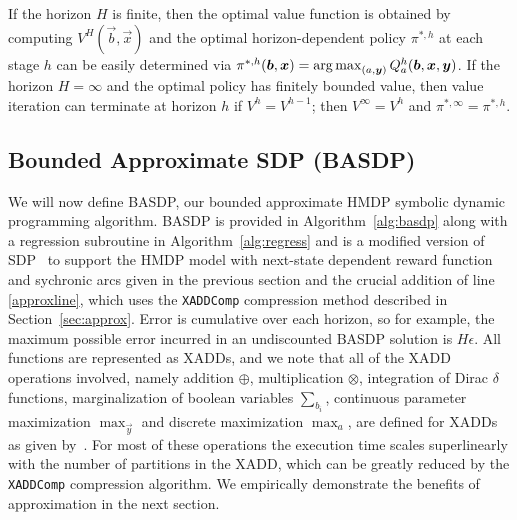 If the horizon $H$ is finite, then the optimal value function is
obtained by computing $V^H(\vec{b},\vec{x})$ and the optimal
horizon-dependent policy $\pi^{*,h}$ at each stage $h$ can be easily
determined via $\pi^{*,h}(\vec{b},\vec{x}) = \argmax_{(a, \vec{y} )}
Q^h_a(\vec{b},\vec{x},\vec{y})$.  If the horizon $H = \infty$ and the
optimal policy has finitely bounded value, then value iteration can
terminate at horizon $h$ if $V^{h} = V^{h-1}$; then $V^\infty = V^h$
and $\pi^{*,\infty} = \pi^{*,h}$.

\subsection{Bounded Approximate SDP (BASDP)}

We will now define BASDP, our bounded approximate HMDP symbolic
dynamic programming algorithm.  BASDP is provided in
Algorithm~\ref{alg:basdp} along with a regression subroutine in
Algorithm~\ref{alg:regress} and is a modified version of
SDP~\cite{zamani12} to support the HMDP model with next-state
dependent reward function and sychronic arcs given in the previous
section and the crucial addition of line \ref{approxline}, which uses
the \texttt{XADDComp} compression method described in
Section~\ref{sec:approx}.  Error is cumulative over each horizon, so for example,
the maximum possible error incurred in an undiscounted BASDP solution
is $H\epsilon$.
All functions are represented as XADDs, and we note that all of the
XADD operations involved, namely addition $\oplus$, multiplication
$\otimes$, integration of Dirac $\delta$ functions, marginalization of
boolean variables $\sum_{b_i}$, continuous parameter maximization
$\max_{\vec{y}}$ and discrete maximization $\max_a$, are defined for
XADDs as given by~\cite{sanner_uai11,zamani12}.  For most of these
operations the execution time scales superlinearly with the number of
partitions in the XADD, which can be greatly reduced by
the \texttt{XADDComp} compression algorithm.  We empirically
demonstrate the benefits of approximation in the next section.
